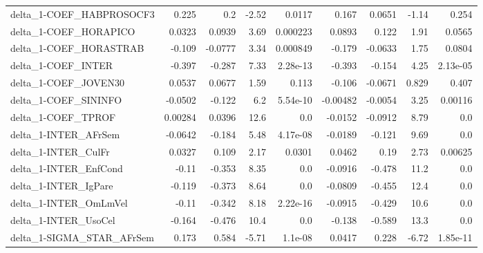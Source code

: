 \begin{tabular}{lrrrrrrrr}
delta\_1-COEF\_HABPROSOCF3              &       0.225 &          0.2 &    -2.52 &   0.0117 &      0.167 &      0.0651 &        -1.14 &         0.254 \\
delta\_1-COEF\_HORAPICO                 &      0.0323 &       0.0939 &     3.69 & 0.000223 &     0.0893 &       0.122 &         1.91 &        0.0565 \\
delta\_1-COEF\_HORASTRAB                &      -0.109 &      -0.0777 &     3.34 & 0.000849 &     -0.179 &     -0.0633 &         1.75 &        0.0804 \\
delta\_1-COEF\_INTER                    &      -0.397 &       -0.287 &     7.33 & 2.28e-13 &     -0.393 &      -0.154 &         4.25 &      2.13e-05 \\
delta\_1-COEF\_JOVEN30                  &      0.0537 &       0.0677 &     1.59 &    0.113 &     -0.106 &     -0.0671 &        0.829 &         0.407 \\
delta\_1-COEF\_SININFO                  &     -0.0502 &       -0.122 &      6.2 & 5.54e-10 &   -0.00482 &     -0.0054 &         3.25 &       0.00116 \\
delta\_1-COEF\_TPROF                    &     0.00284 &       0.0396 &     12.6 &      0.0 &    -0.0152 &     -0.0912 &         8.79 &           0.0 \\
delta\_1-INTER\_AFrSem                  &     -0.0642 &       -0.184 &     5.48 & 4.17e-08 &    -0.0189 &      -0.121 &         9.69 &           0.0 \\
delta\_1-INTER\_CulFr                   &      0.0327 &        0.109 &     2.17 &   0.0301 &     0.0462 &        0.19 &         2.73 &       0.00625 \\
delta\_1-INTER\_EnfCond                 &       -0.11 &       -0.353 &     8.35 &      0.0 &    -0.0916 &      -0.478 &         11.2 &           0.0 \\
delta\_1-INTER\_IgPare                  &      -0.119 &       -0.373 &     8.64 &      0.0 &    -0.0809 &      -0.455 &         12.4 &           0.0 \\
delta\_1-INTER\_OmLmVel                 &       -0.11 &       -0.342 &     8.18 & 2.22e-16 &    -0.0915 &      -0.429 &         10.6 &           0.0 \\
delta\_1-INTER\_UsoCel                  &      -0.164 &       -0.476 &     10.4 &      0.0 &     -0.138 &      -0.589 &         13.3 &           0.0 \\
delta\_1-SIGMA\_STAR\_AFrSem             &       0.173 &        0.584 &    -5.71 &  1.1e-08 &     0.0417 &       0.228 &        -6.72 &      1.85e-11 \\

\end{tabular}
